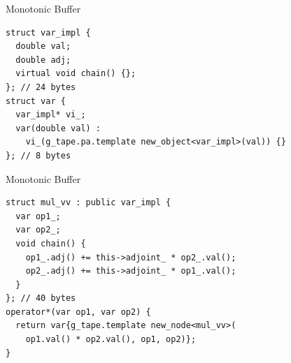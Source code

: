 \documentclass[dvipsnames]{beamer}
\newenvironment{CacheLine}[1][]{
  \begin{tikzpicture}[x=1.2cm,y=0.8cm,font=\footnotesize,>=Stealth,#1]
    \def\CacheH{1.0}   %
    \def\CacheBelow{1.0} %

}{
    \foreach \i in {1,...,7} { \draw[black!40] (\i,0) -- (\i,\CacheH); }
    \draw[line width=0.6pt, rounded corners=2pt] (0,0) rectangle (8,\CacheH);
    \foreach \i in {0,...,7} {
      \node[below=3pt, text=black!75] at (\i+0.5,0) {8B \i};
    }
  \end{tikzpicture}
}
\newcommand{\CacheColor}[2]{%
  \fill[#2, fill opacity=0.35, draw=none] (#1,0) rectangle ++(1,\CacheH);%
}
\newcommand{\CacheMarkBelow}[3][green!60!black]{%
  \draw[-{Stealth[length=3mm]}, very thick, draw=#1] (#2,-\CacheBelow+0.28) -- (#2,0.02);
  \node[below, anchor=west, text=#1] at (#2,-\CacheBelow-0.2) {#3};
}
\newcommand{\CacheSetBelow}[1]{\def\CacheBelow{#1}}
\begin{document}
\begin{frame}[fragile]{Monotonic Buffer}
\begin{verbatim}
struct var_impl {
  double val;
  double adj;
  virtual void chain() {};
}; // 24 bytes
struct var {
  var_impl* vi_;
  var(double val) :
    vi_(g_tape.pa.template new_object<var_impl>(val)) {}
}; // 8 bytes
\end{verbatim}

\end{frame}

\begin{frame}[fragile]{Monotonic Buffer}
\begin{verbatim}
struct mul_vv : public var_impl {
  var op1_;
  var op2_;
  void chain() {
    op1_.adj() += this->adjoint_ * op2_.val();
    op2_.adj() += this->adjoint_ * op1_.val();
  }
}; // 40 bytes
operator*(var op1, var op2) {
  return var{g_tape.template new_node<mul_vv>(
    op1.val() * op2.val(), op1, op2)};
}
\end{verbatim}

\end{frame}
\end{document}
